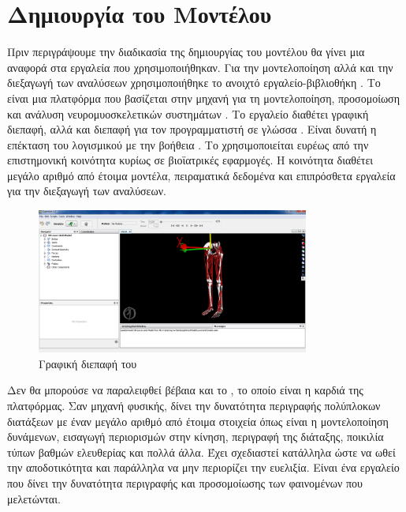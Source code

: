 \section{Δημιουργία του Μοντέλου}

Πριν περιγράψουμε την διαδικασία της δημιουργίας του μοντέλου θα γίνει μια αναφορά στα εργαλεία που χρησιμοποιήθηκαν. Για την μοντελοποίηση αλλά και την διεξαγωγή των αναλύσεων χρησιμοποιήθηκε το ανοιχτό εργαλείο-βιβλιοθήκη . Το  είναι μια πλατφόρμα που βασίζεται στην μηχανή  για τη μοντελοποίηση, προσομοίωση και ανάλυση νευρομυοσκελετικών συστημάτων \cite{delp07}. Το εργαλείο διαθέτει γραφική διεπαφή, αλλά και διεπαφή για τον προγραμματιστή σε γλώσσα . Είναι δυνατή η επέκταση του λογισμικού με την βοήθεια . Το  χρησιμοποιείται ευρέως από την επιστημονική κοινότητα κυρίως σε βιοϊατρικές εφαρμογές. Η κοινότητα διαθέτει μεγάλο αριθμό από έτοιμα μοντέλα, πειραματικά δεδομένα και επιπρόσθετα εργαλεία για την διεξαγωγή των αναλύσεων.

\begin{figure}[H]
    \centering
    \includegraphics[width=0.8\textwidth, keepaspectratio]{fig/opensim.png}
    \caption{Γραφική διεπαφή του }
    \label{fig:opensim-gui}
\end{figure}

Δεν θα μπορούσε να παραλειφθεί βέβαια και το , το οποίο είναι η καρδιά της πλατφόρμας. Σαν μηχανή φυσικής, δίνει την δυνατότητα περιγραφής πολύπλοκων διατάξεων με έναν μεγάλο αριθμό από έτοιμα στοιχεία όπως είναι η μοντελοποίηση δυνάμενων, εισαγωγή περιορισμών στην κίνηση, περιγραφή της διάταξης, ποικιλία τύπων βαθμών ελευθερίας και πολλά άλλα. Έχει σχεδιαστεί κατάλληλα ώστε να ωθεί την αποδοτικότητα και παράλληλα να μην περιορίζει την ευελιξία. Είναι ένα εργαλείο που δίνει την δυνατότητα περιγραφής και προσομοίωσης των φαινομένων που μελετώνται.

